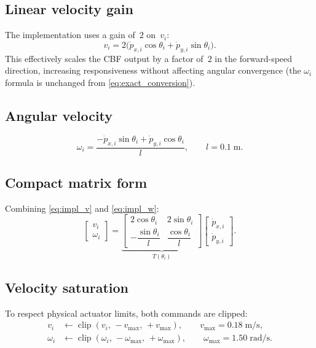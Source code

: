 \documentclass[11pt,a4paper]{article}
\newcommand{\dpdx}[1]{\dot{p}_{x,#1}}
\newcommand{\dpdy}[1]{\dot{p}_{y,#1}}
\newcommand{\vmax}{v_{\max}}
\newcommand{\wmax}{\omega_{\max}}
\begin{document}
\subsection{Linear velocity gain}

The implementation uses a gain of~$2$ on~$v_i$:
\begin{equation}\label{eq:impl_v}
  v_i = 2\bigl(\dpdx{i}\cos\theta_i + \dpdy{i}\sin\theta_i\bigr).
\end{equation}
This effectively scales the CBF output by a factor of~$2$ in the
forward-speed direction, increasing responsiveness without affecting angular
convergence (the $\omega_i$ formula is unchanged from \eqref{eq:exact_conversion}).

\subsection{Angular velocity}

\begin{equation}\label{eq:impl_w}
  \omega_i
  = \frac{-\dpdx{i}\sin\theta_i + \dpdy{i}\cos\theta_i}{l},
  \qquad l = 0.1\;\text{m.}
\end{equation}

\subsection{Compact matrix form}

Combining \eqref{eq:impl_v} and \eqref{eq:impl_w}:
\begin{equation}\label{eq:T}
  \begin{bmatrix}v_i\\\omega_i\end{bmatrix}
  =
  \underbrace{\begin{bmatrix}
    2\cos\theta_i & 2\sin\theta_i \\[4pt]
    -\dfrac{\sin\theta_i}{l} & \dfrac{\cos\theta_i}{l}
  \end{bmatrix}}_{T(\theta_i)}
  \begin{bmatrix}\dpdx{i}\\\dpdy{i}\end{bmatrix}.
\end{equation}

\subsection{Velocity saturation}

To respect physical actuator limits, both commands are clipped:
\begin{align}
  v_i      &\leftarrow \operatorname{clip}(v_i,\,-\vmax,\,+\vmax),
            \qquad \vmax = 0.18\;\text{m/s}, \label{eq:sat_v}\\
  \omega_i &\leftarrow \operatorname{clip}(\omega_i,\,-\wmax,\,+\wmax),
            \qquad \wmax = 1.50\;\text{rad/s}. \label{eq:sat_w}
\end{align}
\end{document}
